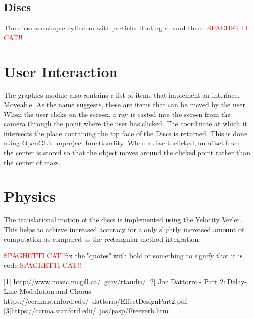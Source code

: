 \documentclass[pdftext,twoside,10pt]{article}
\newcommand{\spag}{\textcolor{red}{SPAGHETTI CAT!!}}
\begin{document}
\subsection{Discs}
The discs are simple cylinders with particles floating around them. \spag

\section{User Interaction}
The graphics module also contains a list of items that implement an interface, Moveable. As the name suggests, these are items that can be moved by the user. When the user clicks on the screen, a ray is casted into the screen from the camera through the point where the user has clicked. The coordinate at which it intersects the plane containing the top face of the Discs is returned. This is done using OpenGL's unproject functionality. When a disc is clicked, an offset from the center is stored so that the object moves around the clicked point rather than the center of mass.

\section{Physics}
The translational motion of the discs is implemented using the Velocity Verlet. This helps to achieve increased accuracy for a only slightly increased amount of computation as compared to the rectangular method integration.


\spag fix the "quotes" with bold or something to signify that it is code \spag

[1] http://www.music.mcgill.ca/~gary/rtaudio/
[2] Jon Dattorro - Part 2: Delay-Line Modulation and Chorus  
https://ccrma.stanford.edu/~dattorro/EffectDesignPart2.pdf 
[3]https://ccrma.stanford.edu/~jos/pasp/Freeverb.html 
\end{document}
